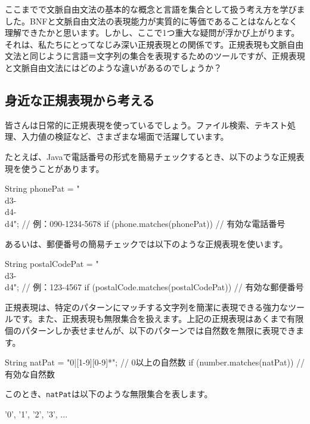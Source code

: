 ここまでで文脈自由文法の基本的な概念と言語を集合として扱う考え方を学びました。BNFと文脈自由文法の表現能力が実質的に等価であることはなんとなく理解できたかと思います。しかし、ここで1つ重大な疑問が浮かび上がります。それは、私たちにとってなじみ深い正規表現との関係です。正規表現も文脈自由文法と同じように言語＝文字列の集合を表現するためのツールですが、正規表現と文脈自由文法にはどのような違いがあるのでしょうか？

\subsection{身近な正規表現から考える}

皆さんは日常的に正規表現を使っているでしょう。ファイル検索、テキスト処理、入力値の検証など、さまざまな場面で活躍しています。

たとえば、Javaで電話番号の形式を簡易チェックするとき、以下のような正規表現を使うことがあります。

\begin{codescreen}{}
String phonePat = "\\d{3}-\\d{4}-\\d{4}";  // 例：090-1234-5678
if (phone.matches(phonePat)) {
    // 有効な電話番号
}
\end{codescreen}

あるいは、郵便番号の簡易チェックでは以下のような正規表現を使います。

\begin{codescreen}{}
String postalCodePat = "\\d{3}-\\d{4}";  // 例：123-4567
if (postalCode.matches(postalCodePat)) {
    // 有効な郵便番号
}
\end{codescreen}

正規表現は、特定のパターンにマッチする文字列を簡潔に表現できる強力なツールです。また、正規表現も無限集合を扱えます。上記の正規表現はあくまで有限個のパターンしか表せませんが、以下のパターンでは自然数を無限に表現できます。

\begin{codescreen}{}
String natPat = "0|[1-9][0-9]*";  // 0以上の自然数
if (number.matches(natPat)) {
    // 有効な自然数
}
\end{codescreen}

このとき、\texttt{natPat}は以下のような無限集合を表します。

\begin{codescreen}{}
{'0', '1', '2', '3', ...}
\end{codescreen}

